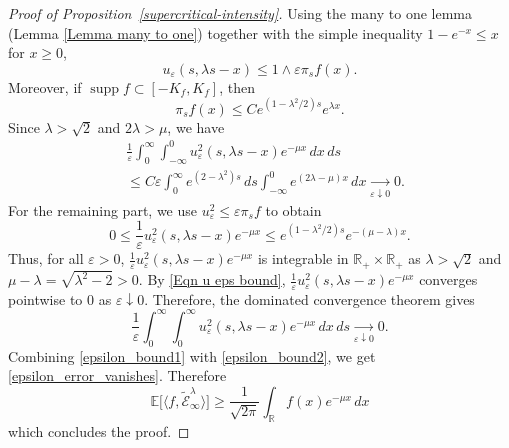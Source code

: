 \documentclass[a4paper,reqno]{amsart}%
\newcommand{\1}{\mathbf 1}
\theoremstyle{mine}
\numberwithin{theorem}{section}
\numberwithin{equation}{section}
\theoremstyle{remark}
\begin{document}
\begin{proof}[Proof of Proposition~\ref{supercritical-intensity}]
   Using the many to one lemma (Lemma \ref{Lemma many to one}) together with the simple inequality $1-e^{-x}\le x$ for $x\ge 0$,
   \begin{equation}\label{Eqn u eps bound}
       u_{\varepsilon }(s,\lambda s-x) \le 1\wedge \varepsilon \pi_s f(x).
   \end{equation}
    Moreover, if $\operatorname{supp}f\subset[-K_f,K_f]$, then \[ \pi_s f(x) \le C e^{(1-\lambda^2/2)s}e^{\lambda x}. \]
   Since $\lambda>\sqrt 2$ and $2\lambda>\mu$, we have
   \begin{equation}\label{epsilon_bound1}
   \begin{aligned}
     &\frac1\varepsilon \int_0^\infty\int_{-\infty}^0 u_{\varepsilon }^2(s,\lambda s-x)e^{-\mu x}\,dx\,ds \\
     &\le C\varepsilon \int_0^\infty e^{(2-\lambda^2)s}\,ds \int_{-\infty}^0 e^{(2\lambda-\mu)x}\,dx \xrightarrow[\varepsilon\downarrow0]{}0. 
     \end{aligned}
     \end{equation}
  For the remaining part, we use $u_{\varepsilon }^2\le \varepsilon \pi_s f$ to obtain 
   \[ 0\le \frac1\varepsilon u_{\varepsilon }^2(s,\lambda s-x)e^{-\mu x} \le e^{(1-\lambda^2/2)s} e^{-(\mu-\lambda)x}. \] 
   Thus, for all $\varepsilon>0$, $\frac{1}{\varepsilon}u_{\varepsilon }^2(s,\lambda s-x)e^{-\mu x}$ is integrable in $\mathbb R_+\times \mathbb R_+$ as $\lambda>\sqrt2$ and $\mu-\lambda=\sqrt{\lambda^2-2}>0$. 
   By \eqref{Eqn u eps bound}, $\frac{1}{\varepsilon}u_{\varepsilon }^2(s,\lambda s-x)e^{-\mu x}$ converges pointwise to $0$ as $\varepsilon \downarrow 0$. Therefore, the dominated convergence theorem gives
   \begin{equation}\label{epsilon_bound2}
         \frac1\varepsilon \int_0^\infty\int_{0}^{\infty} u_{\varepsilon }^2(s,\lambda s-x)e^{-\mu x}\,dx\,ds \xrightarrow[\varepsilon\downarrow0]{}0. 
   \end{equation}
   Combining \eqref{epsilon_bound1} with \eqref{epsilon_bound2}, we get \eqref{epsilon_error_vanishes}. Therefore \[ \mathbb E\big[ \langle f,\widetilde{\mathcal E}^{\lambda}_{\infty}\rangle \big] \ge \frac{1}{\sqrt{2\pi}}\int_{\mathbb R} f(x)e^{-\mu x}\,dx  \] 
   which concludes the proof. 
\end{proof}

 
 
\end{document}
